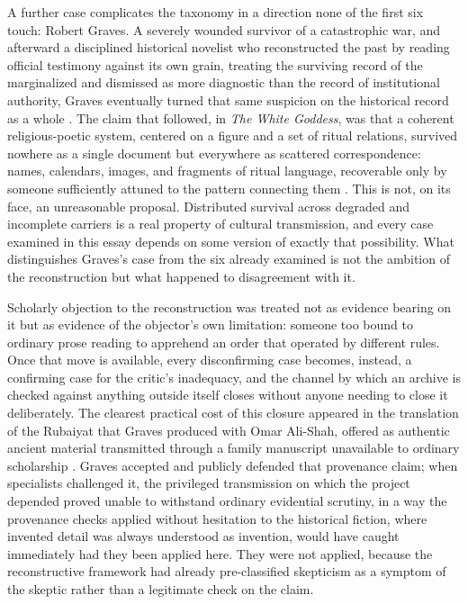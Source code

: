 \documentclass[11pt]{article}
\begin{document}
A further case complicates the taxonomy in a direction none of the first six touch: Robert Graves. A severely wounded survivor of a catastrophic war, and afterward a disciplined historical novelist who reconstructed the past by reading official testimony against its own grain, treating the surviving record of the marginalized and dismissed as more diagnostic than the record of institutional authority, Graves eventually turned that same suspicion on the historical record as a whole \cite{graves1929}. The claim that followed, in \emph{The White Goddess}, was that a coherent religious-poetic system, centered on a figure and a set of ritual relations, survived nowhere as a single document but everywhere as scattered correspondence: names, calendars, images, and fragments of ritual language, recoverable only by someone sufficiently attuned to the pattern connecting them \cite{graves1948}. This is not, on its face, an unreasonable proposal. Distributed survival across degraded and incomplete carriers is a real property of cultural transmission, and every case examined in this essay depends on some version of exactly that possibility. What distinguishes Graves's case from the six already examined is not the ambition of the reconstruction but what happened to disagreement with it.

Scholarly objection to the reconstruction was treated not as evidence bearing on it but as evidence of the objector's own limitation: someone too bound to ordinary prose reading to apprehend an order that operated by different rules. Once that move is available, every disconfirming case becomes, instead, a confirming case for the critic's inadequacy, and the channel by which an archive is checked against anything outside itself closes without anyone needing to close it deliberately. The clearest practical cost of this closure appeared in the translation of the Rubaiyat that Graves produced with Omar Ali-Shah, offered as authentic ancient material transmitted through a family manuscript unavailable to ordinary scholarship \cite{gravesalishah1967}. Graves accepted and publicly defended that provenance claim; when specialists challenged it, the privileged transmission on which the project depended proved unable to withstand ordinary evidential scrutiny, in a way the provenance checks applied without hesitation to the historical fiction, where invented detail was always understood as invention, would have caught immediately had they been applied here. They were not applied, because the reconstructive framework had already pre-classified skepticism as a symptom of the skeptic rather than a legitimate check on the claim.
\end{document}
